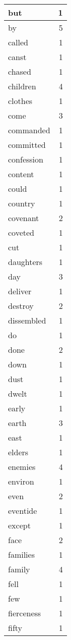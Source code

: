 \begin{center}
\begin{longtable}{l|r}
but & 1\\ \hline 
by & 5\\ \hline 
called & 1\\ \hline 
canst & 1\\ \hline 
chased & 1\\ \hline 
children & 4\\ \hline 
clothes & 1\\ \hline 
come & 3\\ \hline 
commanded & 1\\ \hline 
committed & 1\\ \hline 
confession & 1\\ \hline 
content & 1\\ \hline 
could & 1\\ \hline 
country & 1\\ \hline 
covenant & 2\\ \hline 
coveted & 1\\ \hline 
cut & 1\\ \hline 
daughters & 1\\ \hline 
day & 3\\ \hline 
deliver & 1\\ \hline 
destroy & 2\\ \hline 
dissembled & 1\\ \hline 
do & 1\\ \hline 
done & 2\\ \hline 
down & 1\\ \hline 
dust & 1\\ \hline 
dwelt & 1\\ \hline 
early & 1\\ \hline 
earth & 3\\ \hline 
east & 1\\ \hline 
elders & 1\\ \hline 
enemies & 4\\ \hline 
environ & 1\\ \hline 
even & 2\\ \hline 
eventide & 1\\ \hline 
except & 1\\ \hline 
face & 2\\ \hline 
families & 1\\ \hline 
family & 4\\ \hline 
fell & 1\\ \hline 
few & 1\\ \hline 
fierceness & 1\\ \hline 
fifty & 1\\ \hline 

\end{longtable}
\end{center}
